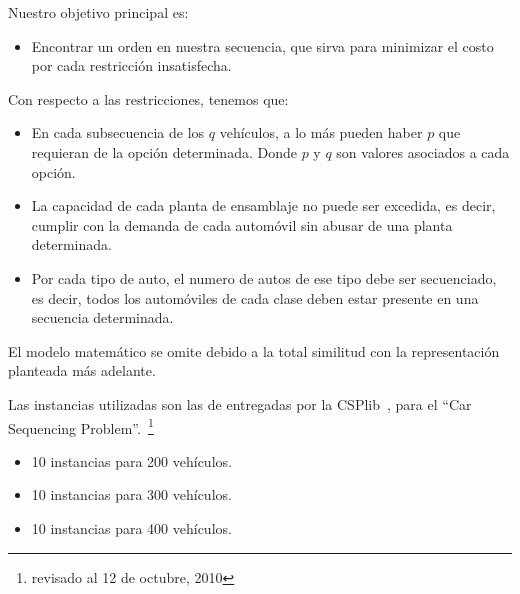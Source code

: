 Nuestro objetivo principal es:
\begin{itemize}
    \item Encontrar un orden en nuestra secuencia, que sirva para minimizar el costo por cada restricción insatisfecha.
\end{itemize}

Con respecto a las restricciones, tenemos que:
\begin{itemize}
    \item En cada subsecuencia de los $q$ vehículos, a lo más pueden haber $p$ que requieran de la opción determinada.
        Donde $p$ y $q$ son valores asociados a cada opción.
    \item La capacidad de cada planta de ensamblaje no puede ser excedida, es decir, cumplir con la demanda de cada automóvil
        sin abusar de una planta determinada.
    \item Por cada tipo de auto, el numero de autos de ese tipo debe ser secuenciado, es decir, todos los automóviles de cada clase
        deben estar presente en una secuencia determinada.
\end{itemize}

El modelo matemático se omite debido a la total similitud con la representación planteada más adelante.

Las instancias utilizadas son las de entregadas por la CSPlib~\cite{CSP},
para el ``Car Sequencing Problem''.~\footnote{revisado al 12 de octubre, 2010}
\begin{itemize}
	\item 10 instancias para 200 vehículos.
	\item 10 instancias para 300 vehículos.
	\item 10 instancias para 400 vehículos.
\end{itemize}
